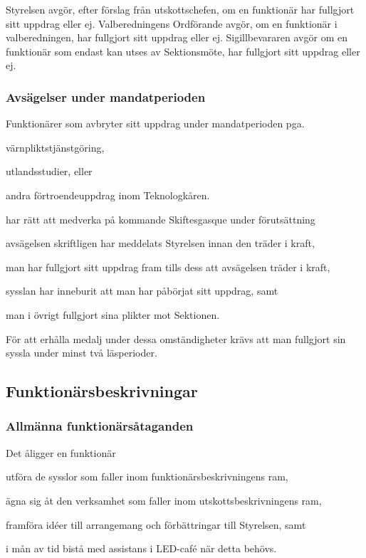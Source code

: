 \documentclass[10pt]{article}
\begin{document}
Styrelsen avgör, efter förslag från utskottschefen, om en funktionär har fullgjort sitt uppdrag eller ej. Valberedningens Ordförande avgör, om en funktionär i valberedningen, har fullgjort sitt uppdrag eller ej. Sigillbevararen avgör om en funktionär som endast kan utses av Sektionsmöte, har fullgjort sitt uppdrag eller ej.

\subsubsection{Avsägelser under mandatperioden}
Funktionärer som avbryter sitt uppdrag under mandatperioden pga.
\begin{alphlist}
    \item värnpliktstjänstgöring,
    \item utlandsstudier, eller
    \item andra förtroendeuppdrag inom Teknologkåren.
\end{alphlist}
har rätt att medverka på kommande Skiftesgasque under förutsättning
\begin{attlist}
    \item avsägelsen skriftligen har meddelats Styrelsen innan den träder
        i kraft,
    \item man har fullgjort sitt uppdrag fram tills dess att avsägelsen
        träder i kraft,
    \item sysslan har inneburit att man har påbörjat sitt uppdrag, samt
    \item man i övrigt fullgjort sina plikter mot Sektionen.
\end{attlist}

För att erhålla medalj under dessa omständigheter krävs att man fullgjort
sin syssla under minst två läsperioder.

\subsection{Funktionärsbeskrivningar}
\subsubsection{Allmänna funktionärsåtaganden}
Det åligger en funktionär
\begin{attlist}
    \item utföra de sysslor som faller inom funktionärsbeskrivningens ram,
    \item ägna sig åt den verksamhet som faller inom utskottsbeskrivningens ram,
    \item framföra idéer till arrangemang och förbättringar till Styrelsen, samt
    \item i mån av tid bistå med assistans i LED-café när detta behövs.
\end{attlist}
\end{document}
